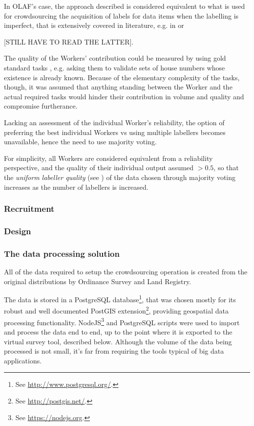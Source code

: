         In OLAF's case, the approach described is considered equivalent to what is used for crowdsourcing the acquisition of labels for data items when the labelling is imperfect, that is extensively covered in literature, e.g. in \cite{sheng2008get} or \cite{Welinder:2010vkb}{[STILL HAVE TO READ THE LATTER{]}. 
        
        The quality of the Workers' contribution could be measured by using gold standard tasks \cite{Oleson:2011tx}, e.g. asking them to validate sets of house numbers whose existence is already known. Because of the elementary complexity of the tasks, though, it was assumed that anything standing between the Worker and the actual required tasks would hinder their contribution in volume and quality and compromise furtherance.
        
        Lacking an assessment of the individual Worker's reliability, the option of preferring the best individual Workers vs using multiple labellers becomes unavailable, hence the need to use majority voting. 
        
        For simplicity, all Workers are considered equivalent from a reliability perspective, and the quality of their individual output assumed $ > 0.5 $, so that the \textit{uniform labeller quality} (see \cite{sheng2008get}) of the data chosen through majority voting increases as the number of labellers is increased.
    
    \subsubsection{Recruitment}
    \subsubsection{Design}
    \subsubsection{The data processing solution}

        All of the data required to setup the crowdsourcing operation is created from the original distributions by Ordinance Survey and Land Registry. 
        
        The data is stored in a PostgreSQL database\footnote{See \url{http://www.postgresql.org/}.}, that was chosen mostly for its robust and well documented PostGIS extension\footnote{See \url{http://postgis.net/}.}, providing geospatial data processing functionality. NodeJS\footnote{See \url{https://nodejs.org}.} and PostgreSQL scripts were used to import and process the data end to end, up to the point where it is exported to the virtual survey tool, described below. Although the volume of the data being processed is not small, it's far from requiring the tools typical of big data applications. 
        
}
